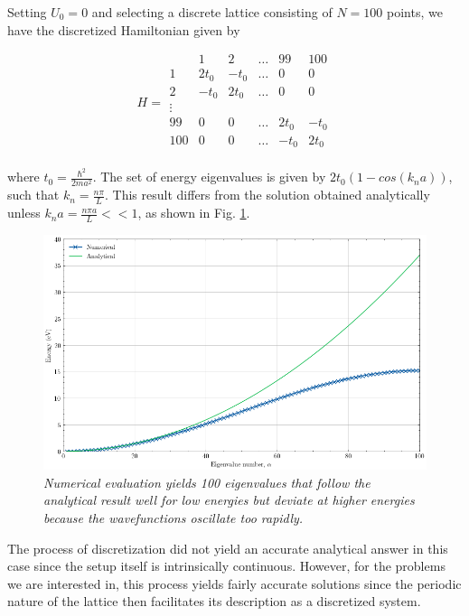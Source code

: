 Setting $U_{0} = 0$ and selecting a discrete lattice consisting of $N = 100$ points, we have the discretized Hamiltonian given by 

\begin{equation}
H =
\begin{matrix}
     & 1 & 2 & \ldots & 99 & 100 \\
    1 & 2t_0 & -t_0 & \ldots & 0 & 0 \\
    2 & -t_0 & 2t_0 & \ldots & 0 & 0 \\
    \vdots  &  &  &  &  &  \\
    99 & 0 & 0 & \ldots & 2t_0 & -t_0 \\
    100 & 0 & 0 & \ldots & -t_0 & 2t_0 \\
\end{matrix}   
\end{equation}

where $t_0 = \frac{\hbar^2}{2ma^{2}}$. The set of energy eigenvalues is given by $2t_{0}(1-cos(k_{n}a))$, such that $k_{n}=\frac{n\pi}{L}$. This result differs from the solution obtained analytically unless $k_{n}a = \frac{n\pi a}{L} << 1$, as shown in Fig. \ref{discrete_PIB}.

\clearpage

\begin{figure}[h]
\centering
\includegraphics[scale=0.6]{discrete_PIB.png}
\caption{\textit{Numerical evaluation yields 100 eigenvalues that follow the analytical result well for low energies but deviate at higher energies because the wavefunctions oscillate too rapidly.}}\label{discrete_PIB}
\end{figure}

\vspace{1cm}

The process of discretization did not yield an accurate analytical answer in this case since the setup itself is intrinsically continuous. However, for the problems we are interested in, this process yields fairly accurate solutions since the periodic nature of the lattice then facilitates its description as a discretized system. \par

